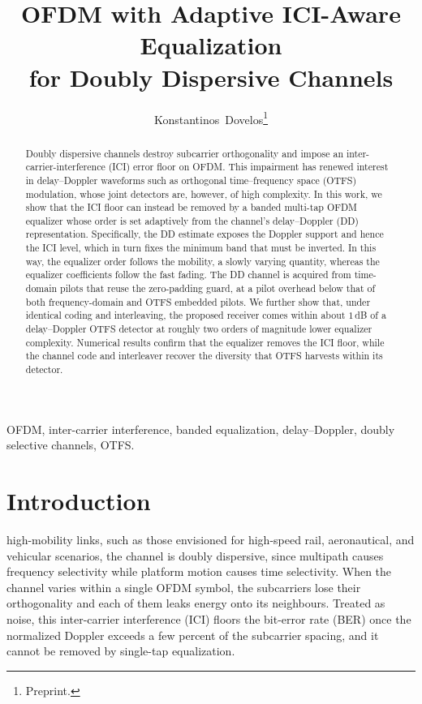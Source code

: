\documentclass[onecolumn,journal]{IEEEtran}
\theoremstyle{bfhead}
\begin{document}
\title{\textbf{\LARGE OFDM with Adaptive ICI-Aware Equalization\\[2pt]
for Doubly Dispersive Channels}}
\author{Konstantinos~Dovelos\thanks{Preprint.}}
\markboth{}{}
\maketitle

\begin{abstract}
Doubly dispersive channels destroy subcarrier orthogonality and impose an
inter-carrier-interference (ICI) error floor on OFDM. This impairment has renewed
interest in delay--Doppler waveforms such as orthogonal time--frequency space
(OTFS) modulation, whose joint detectors are, however, of high complexity. In
this work, we show that the ICI floor can instead be removed by a banded
multi-tap OFDM equalizer whose order is set adaptively from the channel's
delay--Doppler (DD) representation. Specifically, the DD estimate exposes the
Doppler support and hence the ICI level, which in turn fixes the minimum band
that must be inverted. In this way, the equalizer order follows the mobility, a
slowly varying quantity, whereas the equalizer coefficients follow the fast
fading. The DD channel is acquired from
time-domain pilots that reuse the zero-padding guard, at a pilot overhead below
that of both frequency-domain and OTFS embedded pilots. We further
show that, under identical coding and interleaving, the proposed receiver comes
within about $1$\,dB of a delay--Doppler OTFS detector at roughly two orders of
magnitude lower equalizer complexity. Numerical results confirm that the
equalizer removes the ICI floor, while the channel code and interleaver recover
the diversity that OTFS harvests within its detector.
\end{abstract}

\begin{IEEEkeywords}
OFDM, inter-carrier interference, banded equalization, delay--Doppler,
doubly selective channels, OTFS.
\end{IEEEkeywords}

\section{Introduction}
 high-mobility links, such as those envisioned for high-speed
rail, aeronautical, and vehicular scenarios, the channel is doubly dispersive,
since multipath causes frequency selectivity while platform motion causes time
selectivity. When the channel varies within a single OFDM symbol, the subcarriers
lose their orthogonality and each of them leaks energy onto its neighbours.
Treated as noise, this inter-carrier interference (ICI) floors the bit-error rate
(BER) once the normalized Doppler exceeds a few percent of the subcarrier
spacing, and it cannot be removed by single-tap equalization.
\end{document}
